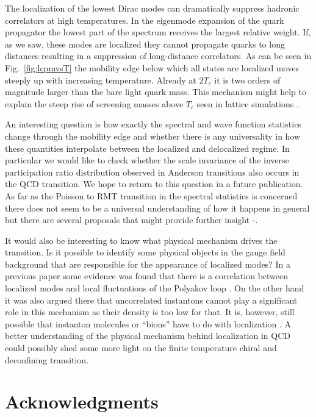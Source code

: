 \documentclass[twocolumn, prd, preprintnumbers, amsmath,
  amssymb, showpacs, floatfix]{revtex4-1}
\begin{document}
The localization of the lowest Dirac modes can dramatically suppress hadronic
correlators at high temperatures. In the eigenmode expansion of the quark
propagator the lowest part of the spectrum receives the largest relative
weight. If, as we saw, these modes are localized they cannot propagate quarks
to long distances resulting in a suppression of long-distance correlators. As
can be seen in Fig.~\ref{fig:lcpmvsT} the mobility edge below which all states
are localized moves steeply up with increasing temperature. Already at $2T_c$
it is two orders of magnitude larger than the bare light quark mass. This
mechanism might help to explain the steep rise of screening masses above $T_c$
seen in lattice simulations \cite{Cheng:2010fe}.

An interesting question is how exactly the spectral and wave function
statistics change through the mobility edge and whether there is any
universality in how these quantities interpolate between the localized and
delocalized regime. In particular we would like to check whether the scale
invariance of the inverse participation ratio distribution observed in
Anderson transitions \cite{logP2} also occurs in the QCD transition. We hope
to return to this question in a future publication. As far as the Poisson to
RMT transition in the spectral statistics is concerned there does not seem to
be a universal understanding of how it happens in general but there are
several proposals that might provide further insight
\cite{Schierenberg:2012ut}-\cite{NishigakiPRE}.

It would also be interesting to know what physical mechanism drives the
transition. Is it possible to identify some physical objects in the gauge
field background that are responsible for the appearance of localized
modes? In a previous paper some evidence was found that there is a correlation
between localized modes and local fluctuations of the Polyakov loop
\cite{Bruckmann:2011cc}. On the other hand it was also argued there that
uncorrelated instantons cannot play a significant role in this mechanism as
their density is too low for that. It is, however, still possible that
instanton molecules or ``bions'' have to do with localization
\cite{Anber:2011gn}. A better understanding of the physical mechanism behind
localization in QCD could possibly shed some more light on the finite
temperature chiral and deconfining transition.

\section*{Acknowledgments}
\end{document}
